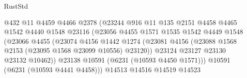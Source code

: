 \begin{lexlean}{RustStd}
\begin{coremodule}
{{                                        @432
                                        @11
                                        @4459
                                        @4466
                                        @2378
                                        (@23244
                                          @916
                                          @11
                                          @135
                                          @2151
                                          @4458
                                          @4465
                                          @1542
                                          @4440
                                          @1548
                                          @23116
                                          (@23056
                                            @4455
                                            @1571
                                            @1535
                                            @1542
                                            @4449
                                            @1548
                                            (@23066
                                              @4455
                                              (@23074
                                                @4156
                                                @1442
                                                @1274
                                                (@23081
                                                  @4156
                                                  (@23088
                                                    @1568
                                                    @2153
                                                    (@23095 @1568 @23099 @10556)
                                                    @23120))
                                                @23124
                                                @23127
                                                @23130
                                                @23132
                                                @10462))
                                            @23138
                                            @10591
                                            (@6231 (@10593 @4450 @1571)))
                                          @10591
                                          (@6231 (@10593 @4441 @4458)))
                                        @14513
                                        @14516
                                        @14519
                                        @14523
}}
\end{coremodule}
\end{lexlean}
